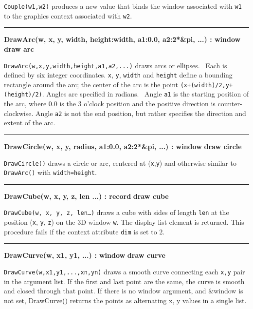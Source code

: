 \noindent
\texttt{Couple(w1,w2)} produces a new value that binds the window
associated with \texttt{w1} to the graphics context associated with
\texttt{w2}.

\bigskip\hrule\vspace{0.1cm}
\noindent
{\bf DrawArc(w, x, y, width, height:width, a1:0.0, a2:2*\&pi, ...) : window } \hfill {\bf draw arc}

\noindent
\texttt{DrawArc(w,x,y,width,height,a1,a2,...)} draws arcs or ellipses.
\ Each is defined by six integer coordinates. \texttt{x}, \texttt{y},
\texttt{width} and \texttt{height} define a bounding rectangle around
the arc; the center of the arc is the point
\texttt{(x+(width)/2,y+(height)/2)}. Angles are specified in radians.
\ Angle \texttt{a1} is the starting position of the arc, where 0.0 is
the 3 o'clock position and the positive direction is
counter-clockwise. Angle \texttt{a2} is not the end position, but
rather specifies the direction and extent of the arc.

\bigskip\hrule\vspace{0.1cm}
\noindent
{\bf DrawCircle(w, x, y, radius, a1:0.0, a2:2*\&pi, ...) : window } \hfill {\bf draw circle}

\noindent
\texttt{DrawCircle()} draws a circle or arc, centered at
(\texttt{x},\texttt{y}) and otherwise similar to \texttt{DrawArc()}
with \texttt{width=height}.

\bigskip\hrule\vspace{0.1cm}
\noindent
{\bf DrawCube(w, x, y, z, len ...) : record } \hfill {\bf draw cube}

\noindent
\texttt{DrawCube(w, x, y, z, len{\dots})} draws a cube with sides of
length \texttt{len} at the position (\texttt{x}, \texttt{y},
\texttt{z}) on the 3D window \texttt{w}. The display list element is
returned. This procedure fails if the context attribute \texttt{dim} is
set to 2. 

\bigskip\hrule\vspace{0.1cm}
\noindent
{\bf DrawCurve(w, x1, y1, ...) : window } \hfill {\bf draw curve}

\noindent
\texttt{DrawCurve(w,x1,y1,...,xn,yn)} draws a smooth curve connecting
each \texttt{x,y} pair in the argument list. If the first and last
point are the same, the curve is smooth and closed through that point.
If there is no window argument, and \&window is not set, DrawCurve()
returns the points as alternating x, y values in a single list.

